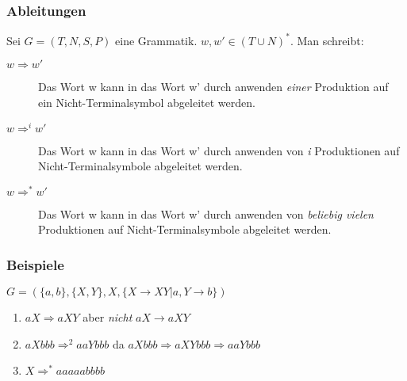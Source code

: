 \begin{frame}
  \frametitle{Ableitungen}
  \begin{definition}
    Sei $G = (T, N, S, P)$ eine Grammatik. $w, w' \in (T \cup N)^*$.
    Man schreibt:
    \begin{description}
      \item[$w \Longrightarrow w'$] Das Wort w kann in das Wort w' durch anwenden
        \emph{einer} Produktion auf ein Nicht-Terminalsymbol abgeleitet werden.
      \item[$w \Longrightarrow^i w'$] Das Wort w kann in das Wort w' durch anwenden von
        \emph{i} Produktionen auf Nicht-Terminalsymbole abgeleitet werden.
      \item[$w \Longrightarrow^* w'$] Das Wort w kann in das Wort w' durch anwenden von
        \emph{beliebig vielen} Produktionen auf Nicht-Terminalsymbole abgeleitet werden.
    \end{description}
  \end{definition}
\end{frame}

\begin{frame}
  \frametitle{Beispiele}
    $G = (\{a, b\}, \{X, Y\}, X, \{X \longrightarrow XY | a, Y \longrightarrow b\})$
  \begin{exampleblock}{}
    \begin{enumerate}
      \item $aX \Longrightarrow aXY$ aber \emph{nicht} $aX \longrightarrow aXY$
      \item $aXbbb \Longrightarrow^2 aaYbbb$ da $aXbbb \Longrightarrow aXYbbb \Longrightarrow aaYbbb$
      \item $ X \Longrightarrow^* aaaaabbbb$
    \end{enumerate}
  \end{exampleblock}
\end{frame}

